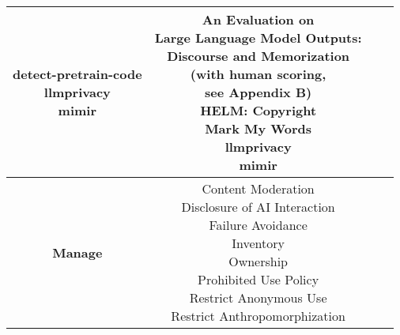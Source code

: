 \documentclass[fleqn]{article}
\begin{document}
\begin{table}[H]
\begin{tabular}{|c|c|c|c|}
{			\textbullet\hspace{3pt} detect-pretrain-code\\ 	
			\textbullet\hspace{3pt} llmprivacy\\ 	
			\textbullet\hspace{3pt} mimir\\ 	
		} 
		& \makecell[l]{ 	
			\textbullet\hspace{3pt} An Evaluation on\\\hspace{10pt}Large Language Model Outputs:\\\hspace{10pt}Discourse and Memorization\\\hspace{10pt}(with human scoring,\\\hspace{10pt}see Appendix B)\\ 	
			\textbullet\hspace{3pt} HELM: Copyright\\ 	
			\textbullet\hspace{3pt} Mark My Words\\ 	
			\textbullet\hspace{3pt} llmprivacy\\ 	
			\textbullet\hspace{3pt} mimir	\\ 	
		} \\ 
		\hline		
		\textbf{Manage} &
		\makecell[l]{ 	
			\textbullet\hspace{3pt} Content Moderation\\ 	
			\textbullet\hspace{3pt} Disclosure of AI Interaction\\ 	
			\textbullet\hspace{3pt} Failure Avoidance\\ 	
			\textbullet\hspace{3pt} Inventory\\ 	
			\textbullet\hspace{3pt} Ownership\\ 	
			\textbullet\hspace{3pt} Prohibited Use Policy\\ 	
			\textbullet\hspace{3pt} Restrict Anonymous Use\\ 	
			\textbullet\hspace{3pt} Restrict Anthropomorphization\\				
}
\end{tabular}
\end{table}
\end{document}
